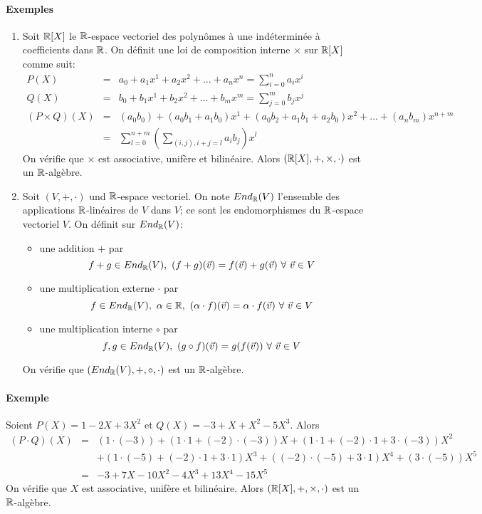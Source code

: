 \paragraph{Exemples}
\begin{enumerate}[1)]
  \item Soit $\mathbb{R}[X]$ le $\mathbb{R}$-espace vectoriel des polynômes à une indéterminée à  coefficients dans $\mathbb{R}$. On définit une loi de composition interne $\times$ sur $\mathbb{R}[X]$ comme suit:
    \begin{eqnarray*}
      P(X) &=& a_0 + a_1 x^1 + a_2 x^2 + \ldots + a_n x^n = \sum_{i=0}^{n} a_i x^i \\
      Q(X) &=& b_0 + b_1 x^1 + b_2 x^2 + \ldots + b_m x^m = \sum_{j=0}^{m} b_j x^j \\
      (P \times Q)(X) &=& (a_0 b_0) + (a_0 b_1 + a_1 b_0) x^1 + (a_0 b_2 + a_1 b_1 + a_2 b_0) x^2 + \ldots + (a_n b_m) x^{n+m} \\
        &=& \sum_{l=0}^{n+m} \left ( \sum_{(i, j), i+j=l} a_i b_j \right ) x^l
    \end{eqnarray*}
    On vérifie que $\times$ est associative, unifère et bilinéaire. Alors $(\mathbb{R}[X], + , \times, \cdot)$ est un $\mathbb{R}$-algèbre.
    
  \item Soit $(V, +, \cdot)$ und $\mathbb{R}$-espace vectoriel. On note $End_{\mathbb{R}}(V)$ l'ensemble des applications $\mathbb{R}$-linéaires de $V$ dans $V$; ce sont les endomorphismes du $\mathbb{R}$-espace vectoriel $V$. On définit sur $End_{\mathbb{R}}(V)$:
    \begin{itemize}
      \item une addition $+$ par
        $$f+g \in End_{\mathbb{R}}(V), ~ (f+g)(\vec{v}) = f(\vec{v}) + g(\vec{v}) ~ \forall ~ \vec{v} \in V$$
      \item une multiplication externe $\cdot$ par
        $$f \in End_{\mathbb{R}}(V), ~ \alpha \in \mathbb{R}, ~ (\alpha \cdot f)(\vec{v}) = \alpha \cdot f(\vec{v}) ~ \forall ~ \vec{v} \in V$$
      \item une multiplication interne $\circ$ par
        $$f, g \in End_{\mathbb{R}}(V), ~ (g \circ f)(\vec{v}) = g(f(\vec{v})) ~ \forall ~ \vec{v} \in V$$
    \end{itemize} 
    On vérifie que $(End_{\mathbb{R}}(V), +, \circ, \cdot)$ est un $\mathbb{R}$-algèbre.
\end{enumerate}

\paragraph{Exemple} Soient $P(X) = 1 - 2 X + 3 X^2$ et $Q(X) = -3 + X + X^2 - 5 X^3$. Alors
\begin{eqnarray*}
  (P \cdot Q)(X) &=& (1 \cdot (-3)) + (1 \cdot 1 + (-2) \cdot (-3)) X + (1 \cdot 1 + (-2) \cdot 1 + 3 \cdot (-3)) X^2 \\
    && +(1 \cdot (-5) + (-2) \cdot 1 + 3 \cdot 1) X^3 + ((-2) \cdot (-5) + 3 \cdot 1) X^4 + (3 \cdot (-5)) X^5 \\
  &=& -3 + 7 X - 10 X^2 - 4 X^3 + 13 X^4 - 15 X^5
\end{eqnarray*}
On vérifie que $X$ est associative, unifère et bilinéaire. Alors $(\mathbb{R}[X],+ ,\times ,\cdot)$ est un $\mathbb{R}$-algèbre.
